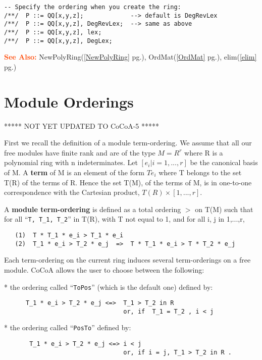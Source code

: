 \documentclass[a4paper]{mybook}
\newcommand\SeeAlso{\par\textcolor{OrangeRed}{\textbf{\large See Also: }}}
\begin{document}
\begin{Verbatim}[label=example, rulecolor=\color{PineGreen}, frame=single]
-- Specify the ordering when you create the ring:
/**/  P ::= QQ[x,y,z];             --> default is DegRevLex
/**/  P ::= QQ[x,y,z], DegRevLex;  --> same as above
/**/  P ::= QQ[x,y,z], lex;
/**/  P ::= QQ[x,y,z], DegLex;
\end{Verbatim}


\SeeAlso %
  NewPolyRing(\ref{NewPolyRing} pg.\pageref{NewPolyRing}), 
    OrdMat(\ref{OrdMat} pg.\pageref{OrdMat}), 
    elim(\ref{elim} pg.\pageref{elim})

\section{Module Orderings}
\label{Module Orderings}

        
***** NOT YET UPDATED TO CoCoA-5 *****
\par 
First we recall the definition of a module term-ordering. We assume
that all our free modules have finite rank and are of the type $M = R^r$
where R is a polynomial ring with n indeterminates.  Let
$[e_i|i=1,...,r]$ be the canonical basis of M. A \textbf{term} of M is an
element of the form $Te_i$ where T belongs to the set T(R) of the terms
of R.  Hence the set T(M), of the terms of M, is in one-to-one
correspondence with the Cartesian product, $T(R)\times [1,...,r]$.
\par 
A \textbf{module term-ordering} is defined as a total ordering $>$ on T(M)
such that for all ``\verb&T, T_1, T_2&'' in T(R), with T not equal to 1, and for
all i, j in {1,...,r},
\begin{verbatim}
   (1)  T * T_1 * e_i > T_1 * e_i
   (2)  T_1 * e_i > T_2 * e_j  =>  T * T_1 * e_i > T * T_2 * e_j
\end{verbatim}
Each term-ordering on the current ring induces several term-orderings
on a free module.  CoCoA allows the user to choose between the
following:
\par 
   * the ordering called ``\verb&ToPos&'' (which is the default one) defined by:
\begin{verbatim}
      T_1 * e_i > T_2 * e_j <=>  T_1 > T_2 in R
                                 or, if  T_1 = T_2 , i < j
\end{verbatim}
   * the ordering called ``\verb&PosTo&'' defined by:
\begin{verbatim}
       T_1 * e_i > T_2 * e_j <=> i < j
                                 or, if i = j, T_1 > T_2 in R .
\end{verbatim}
\end{document}
